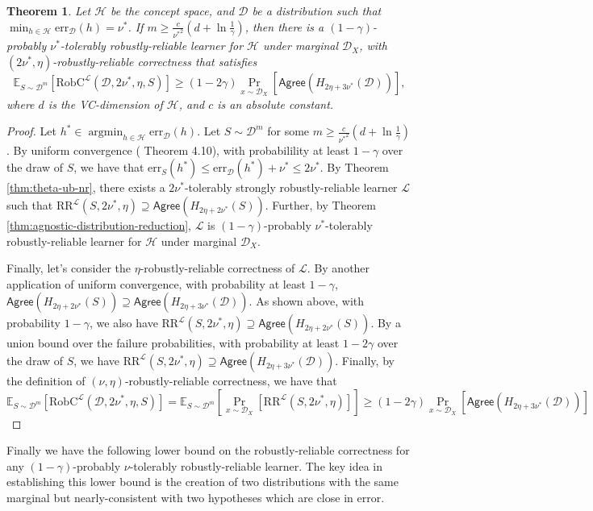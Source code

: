 \documentclass[11pt]{article}
\newcommand{\CR}{\text{RR}}
\newcommand{\err}{\mathrm{err}}
\newtheorem{theorem}{Theorem}[section]
\newcommand{\0}{\mathbf{0}}
\newcommand{\1}{\mathbf{1}}
\newcommand{\cD}{\mathcal{D}}
\newcommand{\cH}{\mathcal{H}}
\newcommand{\cL}{\mathcal{L}}
\newcommand{\bbE}{\mathbb{E}}
\newcommand{\Agree}{\mathsf{Agree}}
\DeclareMathOperator*{\argmin}{argmin}
\begin{document}
\begin{theorem}
Let $\cH$ be the concept space, and $\cD$ be a distribution such that $\min_{h\in\cH}\err_\cD(h)=\nu^*$. If $m\ge \frac{c}{{\nu^*}^2}(d+\ln\frac{1}{\gamma})$, then there is a $(1-\gamma)$-probably $\nu^*$-tolerably  robustly-reliable learner for $\cH$
under marginal $\cD_X$, with $(2\nu^*,\eta)$-robustly-reliable correctness that satisfies
$$\bbE_{S\sim\cD^m}[\text{RobC}^\cL(\cD,2\nu^*,\eta,S)]\ge (1-2\gamma)\Pr_{x\sim\cD_X}[\Agree\left(H_{2\eta+3\nu^*}(\cD)\right)],$$
where $d$ is the VC-dimension of $\cH$, and $c$ is an absolute constant.
\label{thm:distrib-nr}
\end{theorem}
\begin{proof} Let $h^*\in \argmin_{h\in\cH}\err_\cD(h)$.
Let $S\sim \cD^m$ for some $m\ge \frac{c}{{\nu^*}^2}(d+\ln\frac{1}{\gamma})$. By uniform convergence (\cite{anthony2009neural} Theorem 4.10), with probabilility at least $1-\gamma$ over the draw of $S$, we have that $\err_S(h^*)\le\err_\cD(h^*)+\nu^*\le 2\nu^*$.
By Theorem \ref{thm:theta-ub-nr}, there exists a $2\nu^*$-tolerably strongly robustly-reliable learner $\cL$ such that $\CR^\cL(S,2\nu^*,\eta)\supseteq \Agree\left(H_{2\eta+2\nu^*}(S)\right)$. Further, by Theorem \ref{thm:agnostic-distribution-reduction}, $\cL$ is $(1-\gamma)$-probably $\nu^*$-tolerably  robustly-reliable learner for $\cH$
under marginal $\cD_X$.


Finally, let's consider the $\eta$-robustly-reliable correctness of $\cL$. By another application of uniform convergence, with probability at least $1-\gamma$, $\Agree\left(H_{2\eta+2\nu^*}(S)\right)\supseteq \Agree\left(H_{2\eta+3\nu^*}(\cD)\right)$. As shown above, with probability $1-\gamma$, we also have $\CR^\cL(S,2\nu^*,\eta)\supseteq \Agree\left(H_{2\eta+2\nu^*}(S)\right)$. By a union bound over the failure probabilities, with probability at least $1-2\gamma$ over the draw of $S$, we have $\CR^\cL(S,2\nu^*,\eta)\supseteq \Agree\left(H_{2\eta+3\nu^*}(\cD)\right)$. Finally, by the definition of $(\nu,\eta)$-robustly-reliable correctness, we have that $$\bbE_{S\sim\cD^m}[\text{RobC}^\cL(\cD,2\nu^*,\eta,S)]=\bbE_{S\sim\cD^m}[\Pr_{x\sim\cD_X}[\CR^\cL(S,2\nu^*,\eta)]]\ge (1-2\gamma)\Pr_{x\sim\cD_X}[\Agree\left(H_{2\eta+3\nu^*}(\cD)\right)]$$
\end{proof}




Finally we have the following lower bound on the robustly-reliable correctness for any $(1-\gamma)$-probably $\nu$-tolerably robustly-reliable learner. The key idea in establishing this lower bound is the creation of two distributions with the same marginal but nearly-consistent with two hypotheses which are close in error.
\end{document}
